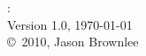 


\begin{flushleft}
%
\mybooktitle: \mybooksubtitle \\
Version 1.0, \today \\
\copyright\ 2010, Jason Brownlee \\
%
\end{flushleft}

\hfill


	
\vfill\vfill\vfill